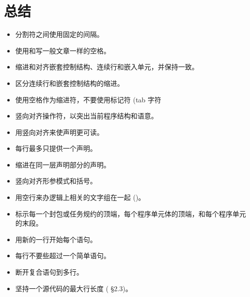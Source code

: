 \section{总结}
\begin{itemize}
    \item 分割符之间使用固定的间隔。
    \item 使用和写一般文章一样的空格。
    \item 缩进和对齐嵌套控制结构、连续行和嵌入单元，并保持一致。
    \item 区分连续行和嵌套控制结构的缩进。
    \item 使用空格作为缩进符，不要使用标记符 (tab 字符\cite{nissen84}
    \item 竖向对齐操作符，以突出当前程序结构和语意。
    \item 用竖向对齐来使声明更可读。
    \item 每行最多只提供一个声明。
    \item 缩进在同一层声明部分的声明。
    \item 竖向对齐形参模式和括号。
    \item 用空行来办逻辑上相关的文字组在一起 (\cite{nasa87})。
    \item 标示每一个封包或任务规约的顶端，每个程序单元体的顶端，和每个程序单元
的末段。
    \item 用新的一行开始每个语句。
    \item 每行不要些超过一个简单语句。
    \item 断开复合语句到多行。
    \item 坚持一个源代码的最大行长度 (\cite{nissen84} \S{}2.3)。
\end{itemize}

